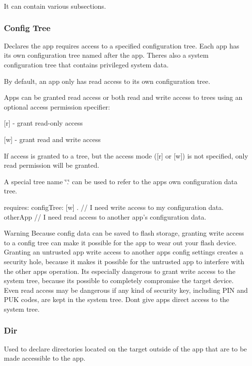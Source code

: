 It can contain various subsections.\hypertarget{def_files_adef_defFilesAdef_requiresConfigTree}{}\subsubsection{Config Tree}\label{def_files_adef_defFilesAdef_requiresConfigTree}
Declares the app requires access to a specified configuration tree. Each app has its own configuration tree named after the app. There\textquotesingle{}s also a system configuration tree that contains privileged system data.

By default, an app only has read access to its own configuration tree.

Apps can be granted read access or both read and write access to trees using an optional access permission specifier\+:


\begin{DoxyItemize}
\item {\ttfamily \mbox{[}r\mbox{]}} -\/ grant read-\/only access
\item {\ttfamily \mbox{[}w\mbox{]}} -\/ grant read and write access
\end{DoxyItemize}

If access is granted to a tree, but the access mode (\mbox{[}r\mbox{]} or \mbox{[}w\mbox{]}) is not specified, only read permission will be granted.

A special tree name \char`\"{}.\char`\"{} can be used to refer to the app\textquotesingle{}s own configuration data tree.

\begin{DoxyVerb}requires:
{
    configTree:
    {
        [w] .       // I need write access to my configuration data.
        otherApp    // I need read access to another app's configuration data.
    }
}
\end{DoxyVerb}


\begin{DoxyWarning}{Warning}
Because config data can be saved to flash storage, granting write access to a config tree can make it possible for the app to wear out your flash device. Granting an untrusted app write access to another app\textquotesingle{}s config settings creates a security hole, because it makes it possible for the untrusted app to interfere with the other app\textquotesingle{}s operation. It\textquotesingle{}s especially dangerous to grant write access to the system tree, because it\textquotesingle{}s possible to completely compromise the target device. Even read access may be dangerous if any kind of security key, including P\+I\+N and P\+U\+K codes, are kept in the system tree. Don\textquotesingle{}t give apps direct access to the {\ttfamily system tree}.
\end{DoxyWarning}
\hypertarget{def_files_adef_defFilesAdef_requiresDir}{}\subsubsection{Dir}\label{def_files_adef_defFilesAdef_requiresDir}
Used to declare directories located on the target outside of the app that are to be made accessible to the app.

